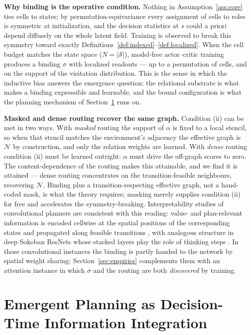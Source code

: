 \documentclass{article} %
\theoremstyle{plain}
\theoremstyle{definition}
\begin{document}
\textbf{Why binding is the operative condition.} Nothing in
Assumption~\ref{ass:core} ties cells to states; by permutation-equivariance
every assignment of cells to roles is symmetric at initialization, and the
decision statistics at $s$ could a priori depend diffusely on the whole latent
field. Training is observed to break this symmetry toward exactly
Definitions~\ref{def:indexed}--\ref{def:localized}. When the cell budget
matches the state space ($N=|\mathcal S|$), model-free actor--critic training
produces a binding $\sigma$ with localized readouts --- up to a permutation of
cells, and on the support of the visitation distribution. This is the sense in
which the inductive bias answers the emergence question: the relational
substrate is what makes a binding expressible and learnable, and the bound
configuration is what the planning mechanism of Section~\ref{sec:planning}
runs on.

\textbf{Masked and dense routing recover the same graph.} Condition (ii) can
be met in two ways. With \emph{masked} routing the support of $\alpha$ is
fixed to a local stencil, so when that stencil matches the environment's
adjacency the effective graph is $\mathcal N$ by construction, and only the
relation weights are learned. With \emph{dense} routing condition (ii) must be
learned outright: $\alpha$ must drive the off-graph scores to zero. The
content-dependence of the routing makes this attainable, and we find it is
attained --- dense routing concentrates on the transition-feasible
neighbours, recovering $\mathcal N$. Binding plus a transition-respecting
effective graph, not a hand-coded mask, is what the theory requires; masking
merely supplies condition (ii) for free and accelerates the symmetry-breaking.
Interpretability studies of convolutional planners are consistent with this
reading: value- and plan-relevant information is encoded cellwise at the
spatial positions of the corresponding states and propagated along feasible
transitions \citep{guez2019investigation,bush2025interpreting}, with analogous
structure in deep Sokoban ResNets whose stacked layers play the role of
thinking steps \citep{taufeeque2024planning}. In those convolutional instances
the binding is partly handed to the network by spatial weight sharing;
Section~\ref{sec:empirics} complements them with an attention instance in
which $\sigma$ and the routing are both \emph{discovered} by training.


\section{Emergent Planning as Decision-Time Information Integration}
\label{sec:planning}
\end{document}

